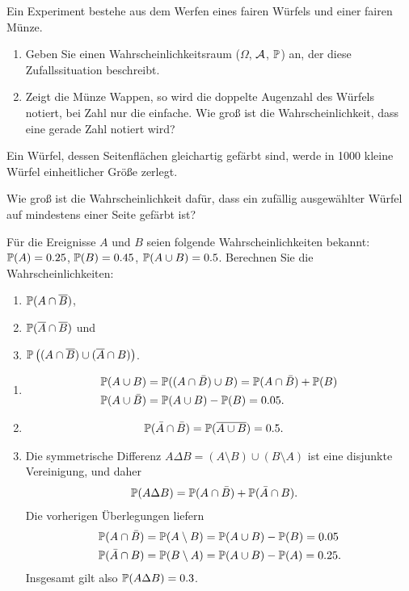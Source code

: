 Ein Experiment bestehe aus dem Werfen eines fairen Würfels und einer fairen Münze.
\begin{enumerate}
    \item Geben Sie einen Wahrscheinlichkeitsraum ($\Omega$, $\mathcal A$, $\mathbb P$) an,
          der diese Zufallssituation beschreibt.
    \item Zeigt die Münze Wappen, so wird die doppelte Augenzahl des Würfels
        notiert, bei Zahl nur die einfache. Wie groß ist die
        Wahrscheinlichkeit, dass eine gerade Zahl notiert wird?
\end{enumerate}

Ein Würfel, dessen Seitenflächen gleichartig gefärbt sind, werde in 1000
kleine Würfel einheitlicher Größe zerlegt.

Wie groß ist die Wahrscheinlichkeit dafür, dass ein zufällig ausgewählter
Würfel auf mindestens einer Seite gefärbt ist?


Für die Ereignisse $A$ und $B$ seien folgende Wahrscheinlichkeiten bekannt:
$\mathbb P(A)=0.25$, $\mathbb P(B)=0.45$, $\mathbb P(A\cup B)=0.5$. Berechnen Sie die
Wahrscheinlichkeiten:
\begin{enumerate}
    \item $\mathbb P(A\cap\overline{B})$,
    \item $\mathbb P(\overline{A}\cap\overline{B})$ und
    \item $\mathbb P\left((A\cap\overline{B})\cup(\overline{A}\cap B)\right)$.
\end{enumerate}

\solution
\begin{enumerate}
    \item \begin{align*}
            \mathbb P(A \cup B) &= \mathbb P( (A \cap \bar B) \cup B ) = 
            \mathbb P( A \cap \bar B  ) + \mathbb P(B) \\
            \mathbb P(A \cup \bar B) &= \mathbb P(A \cup B) - \mathbb P(B) = 0.05.
        \end{align*}
    \item \begin{align*}
            \mathbb P(\bar A \cap \bar B) &= \mathbb P(\overline{A \cup B}) = 0.5.
        \end{align*}
    \item Die symmetrische Differenz $A \Delta B = (A \setminus B) \cup (B \setminus A)$
        ist eine disjunkte Vereinigung, und daher
        \begin{align*}
            \mathbb P(A \Delta B) &= \mathbb P(A \cap \bar B) + \mathbb P(\bar A \cap B).
        \end{align*}
        Die vorherigen Überlegungen liefern
        \begin{align*}
            \mathbb P( A \cap \bar B) &= \mathbb P(A \setminus B) = \mathbb P(A \cup B) - \mathbb P(B) = 0.05 \\
            \mathbb P( \bar A \cap B) &= \mathbb P(B \setminus A) = \mathbb P(A \cup B) - \mathbb P(A) = 0.25.
        \end{align*}
        Insgesamt gilt also $\mathbb P(A \Delta B) = 0.3$.
\end{enumerate}



